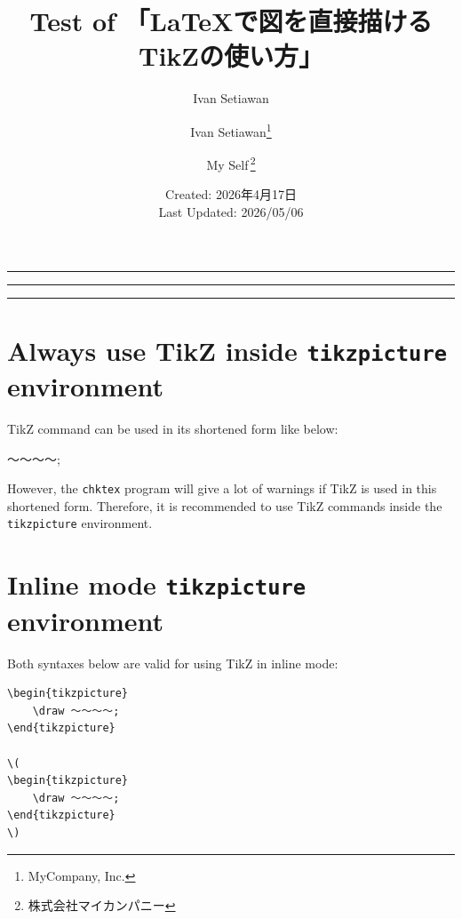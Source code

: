 \documentclass[lualatex]{jlreq}
\title{\bfseries {\huge Test of 「\LaTeX{}で図を直接描けるTikZの使い方」}}
\author{\LARGE Ivan Setiawan}
\author{{\LARGE Ivan Setiawan\thanks{MyCompany, Inc.}} \and {\LARGE My Self\,\thanks{株式会社マイカンパニー}}}
\date{Created: 2026年4月17日\\[0.3em]Last Updated: 2026/05/06}
\begin{document}
\maketitle
\hrule

\lstlistoflistings{}
\vspace{0.5em}
\hrule

\listoftables
\vspace{0.5em}
\hrule

\vspace{1em}

\section*{Always use TikZ inside \texttt{tikzpicture} environment}

TikZ command can be used in its shortened form like below:
\vspace{0.5em}
\begin{center}
    \begin{Sbox}
        \begin{minipage}{0.8 \textwidth}
            \begin{verbatim*}
                \tikz \draw 〜〜〜〜;\end{verbatim*}
        \end{minipage}
    \end{Sbox}
    \shadowbox{\TheSbox}
\end{center}
However, the \texttt{chktex} program will give a lot of warnings if TikZ is used in this shortened form. Therefore, it is recommended to use TikZ commands inside the \texttt{tikzpicture} environment.

\section*{Inline mode \texttt{tikzpicture} environment}

Both syntaxes below are valid for using TikZ in inline mode:
\vspace{0.5em}
\begin{center}
    \begin{Sbox}
        \begin{minipage}{0.8 \textwidth}
            \begin{verbatim}
\begin{tikzpicture}
    \draw 〜〜〜〜;
\end{tikzpicture}

\(
\begin{tikzpicture}
    \draw 〜〜〜〜;
\end{tikzpicture}
\) \end{verbatim}
        \end{minipage}
    \end{Sbox}
    \shadowbox{\TheSbox}
\end{center}
\end{document}
